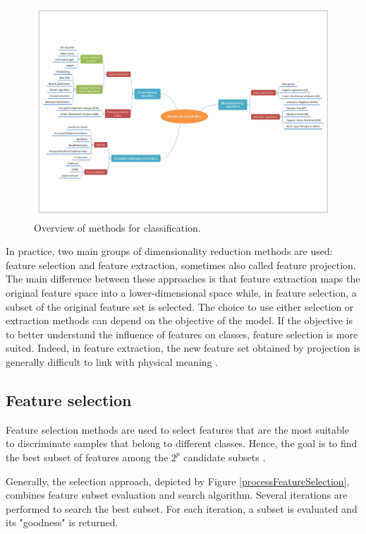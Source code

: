 \documentclass[a4paper,10pt]{article}
\begin{document}
\begin{figure}[htbp]
\vspace{3cm}
\includegraphics[width=\linewidth]{./figures/mindmapML.pdf}
\vspace{1cm}
\caption{Overview of methods for classification.}
\label{mindmapML}
\end{figure}

In practice, two main groups of dimensionality reduction methods are used: feature selection and feature extraction, sometimes also called feature projection. The main difference between these approaches is that feature extraction maps the original feature space into a lower-dimensional space while, in feature selection, a subset of the original feature set is selected. The choice to use either selection or extraction methods can depend on the objective of the model. If the objective is to better understand the influence of features on classes, feature selection is more suited. Indeed, in feature extraction, the new feature set obtained by projection is generally difficult to link with physical meaning \cite{tang2014feature}.

\subsection{Feature selection}

Feature selection methods are used to select features that are the most suitable to discriminate samples that belong to different classes. Hence, the goal is to find the best subset of features among the $2^p$ candidate subsets \cite{dash1997feature}.

Generally, the selection approach, depicted by Figure \ref{processFeatureSelection}, combines feature subset evaluation and search algorithm. Several iterations are performed to search the best subset. For each iteration, a subset is evaluated and its "goodness" is returned. 
\end{document}
